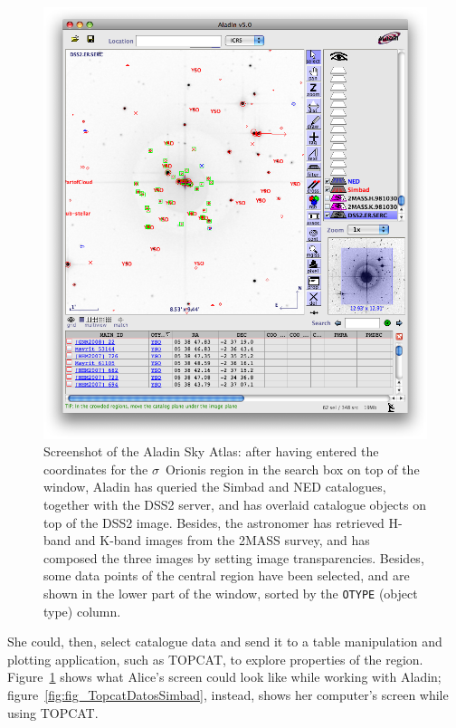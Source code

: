 		\begin{figure}[tbp]
			\centering
				\includegraphics[width=\columnwidth]
				{fig/AladinSigmaOrionisDataSelection.png}
			\caption[Screenshot of the Aladin Sky Atlas]
			{
				Screenshot of the Aladin Sky Atlas: after having
				entered the coordinates for the $\sigma$~Orionis
				region in the search box on top of the window,
				Aladin has queried the Simbad and NED catalogues,
				together with the DSS2 server, and has overlaid
				catalogue objects on top of the DSS2 image.
				Besides, the astronomer has retrieved H-band and
				K-band images from the 2MASS survey, and has
				composed the three images by setting image
				transparencies. Besides, some data points of the
				central region have been selected, and are shown in
				the lower part of the window, sorted by the
				\texttt{OTYPE} (object type) column.
			}
			\label{fig:fig_AladinSigmaOrionisDataSelection}
		\end{figure}
		
		 She could, then, select catalogue data and send it to a
		table manipulation and plotting application, such as
		TOPCAT, to explore properties of the region.
		Figure~\ref{fig:fig_AladinSigmaOrionisDataSelection} shows
		what Alice's screen could look like while working with
		Aladin; figure~\ref{fig:fig_TopcatDatosSimbad}, instead,
		shows her computer's screen while using TOPCAT.
		
